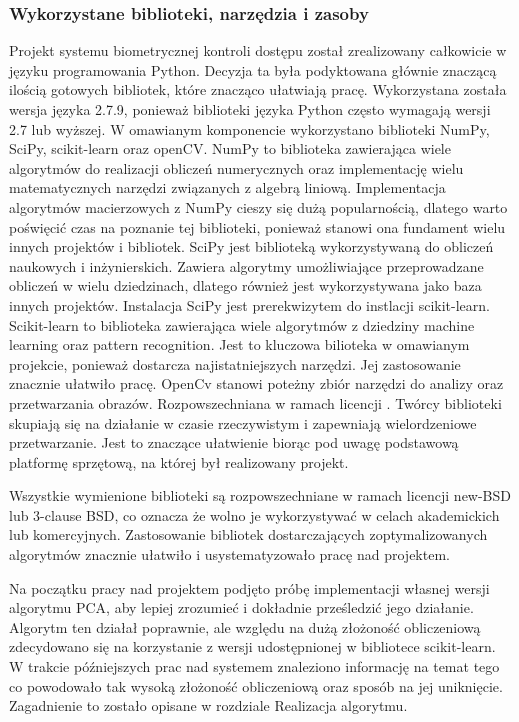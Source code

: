 \documentclass{article}
\begin{document}
\subsubsection{Wykorzystane biblioteki, narzędzia i zasoby}
Projekt systemu biometrycznej kontroli dostępu został zrealizowany całkowicie w języku programowania Python. Decyzja ta była podyktowana głównie znaczącą ilością gotowych bibliotek, które znacząco ułatwiają pracę. Wykorzystana została wersja języka 2.7.9, ponieważ biblioteki języka Python często wymagają wersji 2.7 lub wyższej. W omawianym komponencie wykorzystano biblioteki NumPy, SciPy, scikit-learn oraz openCV. 
NumPy to biblioteka zawierająca wiele algorytmów do realizacji obliczeń numerycznych oraz implementację wielu matematycznych narzędzi związanych z algebrą liniową. Implementacja algorytmów macierzowych z NumPy cieszy się dużą popularnością, dlatego warto poświęcić czas na poznanie tej biblioteki, ponieważ stanowi ona fundament wielu innych projektów i bibliotek.
SciPy jest biblioteką wykorzystywaną do obliczeń naukowych i inżynierskich. Zawiera algorytmy umożliwiające przeprowadzane obliczeń w wielu dziedzinach, dlatego również jest wykorzystywana jako baza innych projektów.
Instalacja SciPy jest prerekwizytem do instlacji scikit-learn. Scikit-learn to biblioteka zawierająca wiele algorytmów z dziedziny machine learning oraz pattern recognition. Jest to kluczowa bilioteka w omawianym projekcie, ponieważ dostarcza najistatniejszych narzędzi. Jej zastosowanie znacznie ułatwiło pracę.
OpenCv stanowi poteżny zbiór narzędzi do analizy oraz przetwarzania obrazów. Rozpowszechniana w ramach licencji . Twórcy biblioteki skupiają się na działanie w czasie rzeczywistym i zapewniają wielordzeniowe przetwarzanie. Jest to znaczące ułatwienie biorąc pod uwagę podstawową platformę sprzętową, na której był realizowany projekt. 

Wszystkie wymienione biblioteki są rozpowszechniane w ramach licencji new-BSD lub 3-clause BSD, co oznacza że wolno je wykorzystywać w celach akademickich lub komercyjnych. Zastosowanie bibliotek dostarczających zoptymalizowanych algorytmów znacznie ułatwiło i usystematyzowało pracę nad projektem.

Na początku pracy nad projektem podjęto próbę implementacji własnej wersji algorytmu PCA, aby lepiej zrozumieć i dokładnie prześledzić jego działanie. Algorytm ten działał poprawnie, ale względu na dużą złożoność obliczeniową zdecydowano się na korzystanie z wersji udostępnionej w bibliotece scikit-learn. W trakcie późniejszych prac nad systemem znaleziono informację na temat tego co powodowało tak wysoką złożoność obliczeniową oraz sposób na jej uniknięcie. Zagadnienie to zostało opisane w rozdziale Realizacja algorytmu.
\end{document}
